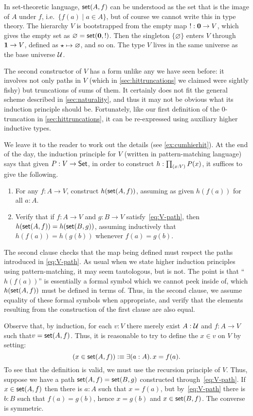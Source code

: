 In set-theoretic language, $\mathsf{set}(A,f)$ can be understood as the set that is the image of $A$ under $f$, i.e.\ $\{ f(a) \mid a
\in A \}$, but of course we cannot write this in type theory. The hierarchy $V$ is
bootstrapped from the empty map $! : \mathbf{0} \to V$, which gives the empty set as $\varnothing = \mathsf{set}(\mathbf{0},!)$.
Then the singleton $\{\varnothing\}$ enters $V$ through $\mathbf{1} \to V$, defined as $\star \mapsto \varnothing$, and so
on. The type $V$ lives in the same universe as the base universe $\mathcal{U}$.

The second constructor of $V$ has a form unlike any we have seen before: it involves not only paths in $V$ (which in \autoref{sec:hittruncations} we claimed were sightly fishy) but truncations of sums of them.
It certainly does not fit the general scheme described in \autoref{sec:naturality}, and thus it may not be obvious what its induction principle should be.
Fortunately, like our first definition of the 0-truncation in \autoref{sec:hittruncations}, it can be re-expressed using auxiliary higher inductive types.

We leave it to the reader to work out the details (see \autoref{ex:cumhierhit}).
At the end of the day, the induction principle for $V$ (written in pattern-matching language) says that given $P:V\to \mathsf{Set}$, in order to construct $h:\prd{x:V} P(x)$, it suffices to give the following.
\begin{enumerate}
\item For any $f:A\to V$, construct $h(\mathsf{set}(A,f))$, assuming as given $h(f(a))$ for all $a:A$.
\item Verify that if $f : A \to V$ and $g : B \to V$ satisfy~\eqref{eq:V-path}, then $h(\mathsf{set}(A,f)) = h(\mathsf{set}(B,g))$, assuming inductively that $h(f(a)) = h(g(b))$ whenever $f(a)=g(b)$.
\end{enumerate}
The second clause checks that the map being defined must respect the paths introduced in \eqref{eq:V-path}.
As usual when we state higher induction principles using pattern-matching, it may seem tautologous, but is not.
The point is that ``$h(f(a))$'' is essentially a formal symbol which we cannot peek inside of, which $h(\mathsf{set}(A,f))$ must be defined in terms of. Thus, in the second clause, we assume equality of these formal symbols when appropriate, and verify that the elements resulting from the construction of the first clause are also equal.  

Observe that, by induction, for each $v:V$ there merely exist $A:\mathcal{U}$ and $f:A\to V$ such that$v=\mathsf{set}(A,f)$.
Thus, it is reasonable to try to define the  $x\in v$ on $V$ by setting:
%
%
\begin{equation*}
  (x \in \vset(A,f)) \defeq \exis{a : A} x = f(a).
\end{equation*}
%
To see that the definition is valid, we must use the recursion principle of $V$.  Thus, suppose we have a path $\mathsf{set}(A, f) = \mathsf{set}(B, g)$
constructed through~\eqref{eq:V-path}. If $x \in \mathsf{set}(A,f)$ then there is $a : A$ such
that $x = f(a)$, but by~\eqref{eq:V-path} there is $b : B$ such that $f(a) = g(b)$, hence
$x = g(b)$ and $x \in \mathsf{set}(B,f)$. The converse is symmetric.

